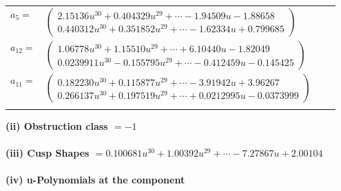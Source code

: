 \documentclass[1p]{elsarticle_modified}
\theoremstyle{definition}
\begin{document}
\begin{tabular}{m{7pt} m{180pt} m{7pt} m{180pt} }
\flushright $a_{5}=$&$\begin{pmatrix}2.15136 u^{30}+0.404329 u^{29}+\cdots-1.94509 u-1.88658\\0.440312 u^{30}+0.351852 u^{29}+\cdots-1.62334 u+0.799685\end{pmatrix}$ \\
\flushright $a_{12}=$&$\begin{pmatrix}1.06778 u^{30}+1.15510 u^{29}+\cdots+6.10440 u-1.82049\\0.0239911 u^{30}-0.155795 u^{29}+\cdots-0.412459 u-0.145425\end{pmatrix}$ \\
\flushright $a_{11}=$&$\begin{pmatrix}0.182230 u^{30}+0.115877 u^{29}+\cdots-3.91942 u+3.96267\\0.266137 u^{30}+0.197519 u^{29}+\cdots+0.0212995 u-0.0373999\end{pmatrix}$\\&\end{tabular}
\flushleft \textbf{(ii) Obstruction class $= -1$}\\~\\
\flushleft \textbf{(iii) Cusp Shapes $= 0.100681 u^{30}+1.00392 u^{29}+\cdots-7.27867 u+2.00104$}\\~\\
\newpage\renewcommand{\arraystretch}{1}
\flushleft \textbf{(iv) u-Polynomials at the component}\newline \\
\end{document}
